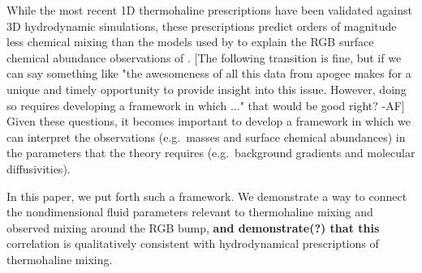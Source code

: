 While the most recent 1D thermohaline prescriptions \citep[e.g.~][]{traxler_etal_2011,brown_etal_2013} have been validated against 3D hydrodynamic simulations, these prescriptions predict orders of magnitude less chemical mixing than the models used by \citet{charbonnel_thermohaline_2007} to explain the RGB surface chemical abundance observations of \citet{Gratton2000} \citep[see Sec.~3.1 of][]{traxler_etal_2011}. 
%
[The following transition is fine, but if we can say something like "the awesomeness of all this data from apogee makes for a unique and timely opportunity to provide insight into this issue. However, doing so requires developing a framework in which ..." that would be good right? -AF]
Given these questions, it becomes important to develop a framework 
in which we can interpret the observations (e.g.~masses and surface chemical abundances) in the parameters that the theory requires (e.g.~background gradients and molecular diffusivities). 

In this paper, we put forth such a framework. 
We demonstrate a way to connect the nondimensional fluid parameters relevant to thermohaline mixing and observed mixing around the RGB bump, \textbf{and demonstrate(?) that this} correlation is qualitatively consistent with hydrodynamical prescriptions of thermohaline mixing. 

